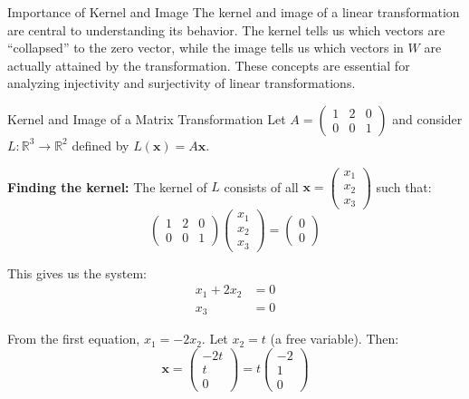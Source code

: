 \documentclass[12pt,a4paper]{article}
\newcommand{\R}{\mathbb{R}}
\newcommand{\vv}[1]{\mathbf{#1}}
\begin{document}
	\begin{remark}{Importance of Kernel and Image}
		The kernel and image of a linear transformation are central to understanding its behavior. The kernel tells us which vectors are ``collapsed'' to the zero vector, while the image tells us which vectors in $W$ are actually attained by the transformation. These concepts are essential for analyzing injectivity and surjectivity of linear transformations.
	\end{remark}
	
	\begin{example}{Kernel and Image of a Matrix Transformation}
		Let $A = \begin{pmatrix} 1 & 2 & 0 \\ 0 & 0 & 1 \end{pmatrix}$ and consider $L: \R^3 \to \R^2$ defined by $L(\vv{x}) = A\vv{x}$.
		
		\textbf{Finding the kernel:} The kernel of $L$ consists of all $\vv{x} = \begin{pmatrix} x_1 \\ x_2 \\ x_3 \end{pmatrix}$ such that:
		\[
		\begin{pmatrix} 1 & 2 & 0 \\ 0 & 0 & 1 \end{pmatrix} \begin{pmatrix} x_1 \\ x_2 \\ x_3 \end{pmatrix} = \begin{pmatrix} 0 \\ 0 \end{pmatrix}
		\]
		
		This gives us the system:
		\begin{align*}
			x_1 + 2x_2 &= 0 \\
			x_3 &= 0
		\end{align*}
		
		From the first equation, $x_1 = -2x_2$. Let $x_2 = t$ (a free variable). Then:
		\[
		\vv{x} = \begin{pmatrix} -2t \\ t \\ 0 \end{pmatrix} = t\begin{pmatrix} -2 \\ 1 \\ 0 \end{pmatrix}
		\]
		

\end{example}
\end{document}
